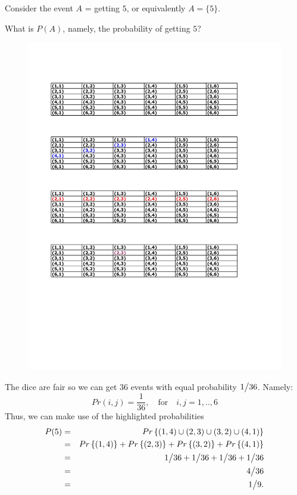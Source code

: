 \documentclass[notes=show,handout]{beamer}\usepackage[]{graphicx}\usepackage[]{color}
\newcommand{\bea}{\begin{eqnarray}}
\newcommand{\eea}{\end{eqnarray}}
\newcommand{\nn}{\nonumber}
\begin{document}
\begin{frame}{\secname}

  \begin{example}[cont'd]
  Consider the event $A$ = getting $5$, or equivalently $A=\{ 5\}$.

  What is $P(A)$, namely, the probability of getting $5$?

  \begin{figure}[h!]
  \centering
  \includegraphics[scale=0.7]{img/c2.pdf}
  \end{figure}
  \end{example}
\end{frame}


\begin{frame}{\secname}

  \begin{example}[cont'd]
  The dice are fair so we can get 36 events with equal probability ${1}\big \slash{36}$. Namely:
  $$
  Pr(i,j) = \frac{1}{36}, \quad \text{for} \quad i,j=1,..,6
  $$
  Thus, we can make use of the highlighted probabilities
  \bea
  P(5) &=& Pr\left\{ (1,4) \cup (2,3) \cup (3,2) \cup  (4,1) \right\} \nn \\
  &=& Pr\left\{ (1,4)  \right\} +  Pr\left\{ (2,3)  \right\} +  Pr\left\{(3,2)  \right\} + Pr\left\{  (4,1) \right\} \nn \\
  &=& {1}\big \slash{36} + {1}\big \slash{36} + {1}\big \slash{36} + {1}\big \slash{36} \nn \\
  &=& {4}\big \slash{36} \nn \\
  &=& 1 \big \slash{9}. \nn
  \eea
  \end{example}
\end{frame}
\end{document}
